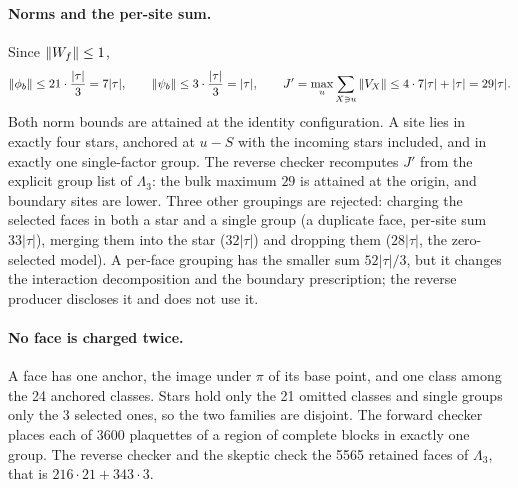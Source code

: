 \paragraph{Norms and the per-site sum.}
Since $\left\lVert W_f\right\rVert\le1$,
\begin{equation}
 \left\lVert\phi_b\right\rVert\le21\cdot\frac{|\tau|}3=7|\tau|,\qquad
 \left\lVert\psi_b\right\rVert\le3\cdot\frac{|\tau|}3=|\tau|,\qquad
 J'=\max_u\sum_{X\ni u}\left\lVert V_X\right\rVert\le4\cdot7|\tau|+|\tau|=29|\tau| .
 \label{eq:ax1-J}
\end{equation}
Both norm bounds are attained at the identity configuration. A site lies in
exactly four stars, anchored at $u-S$ with the incoming stars included, and in
exactly one single-factor group. The reverse checker recomputes $J'$ from the
explicit group list of $\Lambda_3$: the bulk maximum $29$ is attained at the
origin, and boundary sites are lower. Three other groupings are rejected:
charging the selected faces in both a star and a single group (a duplicate
face, per-site sum $33|\tau|$), merging them into the star ($32|\tau|$) and
dropping them ($28|\tau|$, the zero-selected model). A per-face grouping has
the smaller sum $52|\tau|/3$, but it changes the interaction decomposition and
the boundary prescription; the reverse producer discloses it and does not use
it.

\paragraph{No face is charged twice.}
A face has one anchor, the image under $\pi$ of its base point, and one class
among the 24 anchored classes. Stars hold only the 21 omitted classes and
single groups only the 3 selected ones, so the two families are disjoint. The
forward checker places each of 3600 plaquettes of a region of complete blocks
in exactly one group. The reverse checker and the skeptic check the 5565
retained faces of $\Lambda_3$, that is $216\cdot21+343\cdot3$.

